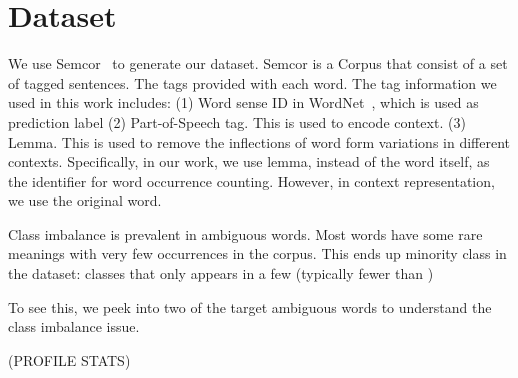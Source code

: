 \section{Dataset}
We use Semcor~\cite{semcor} to generate our dataset.
Semcor is a Corpus that consist of a set of tagged sentences.
The tags provided with each word.
The tag information we used in this work includes: 
(1) Word sense ID in WordNet~\cite{wordnet}, which is used as prediction label
(2) Part-of-Speech tag. This is used to encode context.
(3) Lemma. This is used to remove the inflections of word form variations in
different contexts. Specifically, in our work, we use lemma, instead of the word
itself, as the identifier for word occurrence counting.
However, in context representation, we use the original word.

Class imbalance is prevalent in ambiguous words.
Most words have some rare meanings with very few occurrences in the corpus.
This ends up minority class in the dataset: classes that only appears in a few
(typically fewer than )

To see this, we peek into two of the target ambiguous words to understand the
class imbalance issue.

(PROFILE STATS)
